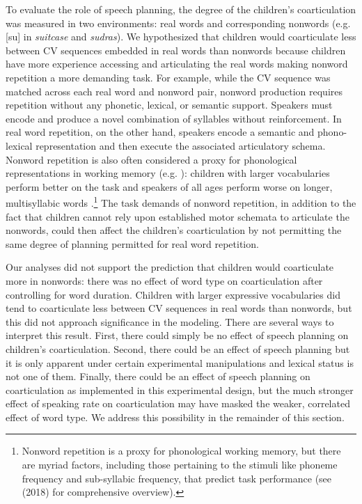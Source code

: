 \documentclass[a4paper,man,natbib,donotrepeattitle, apacite]{apa6}
\begin{document}
To evaluate the role of speech planning, the degree of the children’s coarticulation was measured in two environments: real words and corresponding nonwords (e.g. [su] in \textit{suitcase} and \textit{sudras}). We hypothesized that children would coarticulate less between CV sequences embedded in real words than nonwords because children have more experience accessing and articulating the real words making nonword repetition a more demanding task. For example, while the CV sequence was matched across each real word and nonword pair, nonword production requires repetition without any phonetic, lexical, or semantic support. Speakers must encode and produce a novel combination of syllables without reinforcement. In real word repetition, on the other hand, speakers encode a semantic and phono-lexical representation and then execute the associated articulatory schema. Nonword repetition is also often considered a proxy for phonological representations in working memory (e.g. ): children with larger vocabularies perform better on the task \cite{edwardsInteractionVocabularySize2004,munsonRelationshipsNonwordRepetition2005} and speakers of all ages perform worse on longer, multisyllabic words \cite{byrdNonwordRepetitionPhoneme2012}.\footnote{Nonword repetition is a proxy for phonological working memory, but there are myriad factors, including those pertaining to the stimuli like phoneme frequency and sub-syllabic frequency, that predict task performance (see \citeauthor{szewczykNonwordRepetitionDepends2018} (2018) for comprehensive overview).} The task demands of nonword repetition, in addition to the fact that children cannot rely upon established motor schemata to articulate the nonwords, could then affect the children’s coarticulation by not permitting the same degree of planning permitted for real word repetition. 

Our analyses did not support the prediction that children would coarticulate more in nonwords: there was no effect of word type on coarticulation after controlling for word duration. Children with larger expressive vocabularies did tend to coarticulate less between CV sequences in real words than nonwords, but this did not approach significance in the modeling. There are several ways to interpret this result. First, there could simply be no effect of speech planning on children's coarticulation. Second, there could be an effect of speech planning but it is only apparent under certain experimental manipulations and lexical status is not one of them. Finally, there could be an effect of speech planning on coarticulation as implemented in this experimental design, but the much stronger effect of speaking rate on coarticulation may have masked the weaker, correlated effect of word type. We address this possibility in the remainder of this section.
\end{document}
